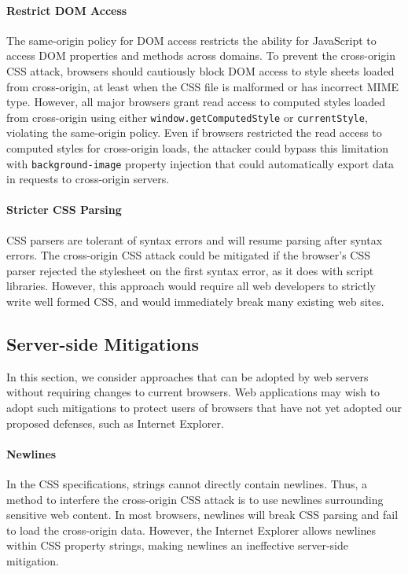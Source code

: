 \documentclass{acm_proc_article-sp}
\begin{document}
\paragraph{Restrict DOM Access}
The same-origin policy for DOM access restricts the ability for JavaScript to access DOM properties and methods across domains. To prevent the cross-origin CSS attack, browsers should cautiously block DOM access to style sheets loaded from cross-origin, at least when the CSS file is malformed or has incorrect MIME type. However, all major browsers grant read access to computed styles loaded from cross-origin using either \texttt{window.getComputedStyle} or \texttt{currentStyle}, violating the same-origin policy. Even if browsers restricted the read access to computed styles for cross-origin loads, the attacker could bypass this limitation with \texttt{background-image} property injection that could automatically export data in requests to cross-origin servers.

\paragraph{Stricter CSS Parsing}
CSS parsers are tolerant of syntax errors and will resume parsing after syntax errors. The cross-origin CSS attack could be mitigated if the browser's CSS parser rejected the stylesheet on the first syntax error, as it does with script libraries. However, this approach would require all web developers to strictly write well formed CSS, and would immediately break many existing web sites.

\subsection{Server-side Mitigations}
In this section, we consider approaches that can be adopted by web servers
without requiring changes to current browsers. Web applications may wish to
adopt such mitigations to protect users of browsers that have not yet adopted
our proposed defenses, such as Internet Explorer.

\paragraph{Newlines}
In the CSS specifications, strings cannot directly contain newlines. Thus, a method to interfere the cross-origin CSS attack is to use newlines surrounding sensitive web content. In most browsers, newlines will break CSS parsing and fail to load the cross-origin data. However, the Internet Explorer allows newlines within CSS property strings, making newlines an ineffective server-side mitigation.
\end{document}
